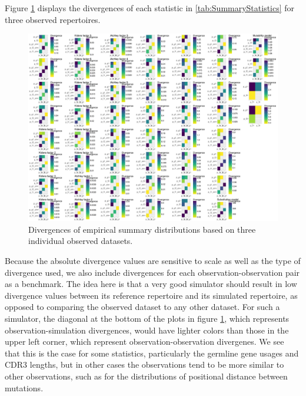 \documentclass{article}
\begin{document}
Figure \ref{fig:SimObs} displays the divergences of each statistic in \ref{tab:SummaryStatistics} for three observed repertoires.
\begin{figure}
    \includegraphics[width=\linewidth]{Figures/sim_obs.pdf}
    \caption{Divergences of empirical summary distributions based on three individual observed datasets.}
    \label{fig:SimObs}
\end{figure}
Because the absolute divergence values are sensitive to scale as well as the type of divergence used, we also include divergences for each observation-observation pair as a benchmark.
The idea here is that a very good simulator should result in low divergence values between its reference repertoire and its simulated repertoire, as opposed to comparing the observed dataset to any other dataset.
For such a simulator, the diagonal at the bottom of the plots in figure \ref{fig:SimObs}, which represents observation-simulation divergences, would have lighter colors than those in the upper left corner, which represent observation-observation divergenes.
We see that this is the case for some statistics, particularly the germline gene usages and CDR3 lengths, but in other cases the observations tend to be more similar to other observations, such as for the distributions of positional distance between mutations.
\end{document}
